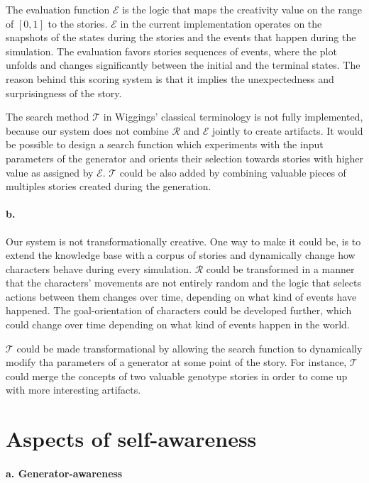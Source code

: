 \documentclass[english]{tktltiki}
\begin{document}
    The evaluation function $\mathcal{E}$ is the logic that maps the creativity value on the range of $[0, 1]$ to the stories. $\mathcal{E}$ in the current implementation operates on the snapshots of the states during the stories and the events that happen during the simulation. The evaluation favors stories sequences of events, where the plot unfolds and changes significantly between the initial and the terminal states. The reason behind this scoring system is that it implies the unexpectedness and surprisingness of the story.

    The search method $\mathcal{T}$ in Wiggings' classical terminology is not fully implemented, because our system does not combine $\mathcal{R}$ and $\mathcal{E}$ jointly to create artifacts. It would be possible to design a search function which experiments with the input parameters of the generator and orients their selection towards stories with higher value as assigned by $\mathcal{E}$. $\mathcal{T}$ could be also added by combining valuable pieces of multiples stories created during the generation. 
    
    \paragraph{b.} Our system is not transformationally creative. One way to make it could be, is to extend the knowledge base with a corpus of stories and dynamically change how characters behave during every simulation. $\mathcal{R}$ could be transformed in a manner that the characters' movements are not entirely random and the logic that selects actions between them changes over time, depending on what kind of events have happened. The goal-orientation of characters could be developed further, which could change over time depending on what kind of events happen in the world. 
    
    $\mathcal{T}$ could be made transformational by allowing the search function to dynamically modify tha parameters of a generator at some point of the story. For instance, $\mathcal{T}$ could merge the concepts of two valuable genotype stories in order to come up with more interesting artifacts.
    
    \pagebreak
    
    \section{Aspects of self-awareness}
    \paragraph{a. Generator-awareness}
\end{document}
